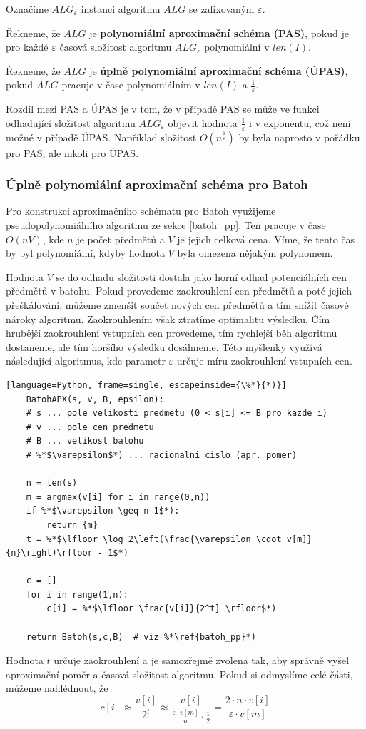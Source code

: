 \documentclass[11pt]{report} %
\numberwithin{equation}{section}
\begin{document}
Označíme $ALG_\varepsilon$ instanci algoritmu $ALG$ se zafixovaným $\varepsilon$.

Řekneme, že $ALG$ je \textbf{polynomiální aproximační schéma (PAS)}, pokud je pro každé $\varepsilon$ časová složitost algoritmu $ALG_\varepsilon$ polynomiální v $len(I)$.

Řekneme, že $ALG$ je \textbf{úplně polynomiální aproximační schéma (ÚPAS)}, pokud $ALG$ pracuje v čase polynomiálním v $len(I)$ a $\frac{1}{\varepsilon}$.

Rozdíl mezi PAS a ÚPAS je v tom, že v případě PAS se může ve funkci odhadující složitost algoritmu $ALG_\varepsilon$ objevit hodnota $\frac{1}{\varepsilon}$ i v exponentu, což není možné v případě ÚPAS. Například složitost $O(n^\frac{1}{\varepsilon})$ by byla naprosto v pořádku pro PAS, ale nikoli pro ÚPAS.

\subsubsection{Úplně polynomiální aproximační schéma pro Batoh}
Pro konstrukci aproximačního schématu pro Batoh využijeme pseudopolynomiálního algoritmu ze sekce \ref{batoh_pp}. 
Ten pracuje v čase $O(nV)$, kde $n$ je počet předmětů a $V$ je jejich celková cena. Víme, že tento čas by byl polynomiální, kdyby hodnota $V$ byla omezena nějakým polynomem. 

Hodnota $V$ se do odhadu složitosti dostala jako horní odhad potenciálních cen předmětů v batohu. Pokud provedeme zaokrouhlení cen předmětů a poté jejich přeškálování, můžeme zmenšit součet nových cen předmětů a tím snížit časové nároky algoritmu. Zaokrouhlením však ztratíme optimalitu výsledku. Čím hrubější zaokrouhlení vstupních cen provedeme, tím rychlejší běh algoritmu dostaneme, ale tím horšího výsledku dosáhneme. Této myšlenky využívá následující algoritmus, kde parametr $\varepsilon$ určuje míru zaokrouhlení vstupních cen.
\bigskip

\begin{minipage}{\linewidth}
	\label{batoh_apx}
	\begin{lstlisting}[language=Python, frame=single, escapeinside={\%*}{*)}]
	BatohAPX(s, v, B, epsilon): 
	# s ... pole velikosti predmetu (0 < s[i] <= B pro kazde i) 
	# v ... pole cen predmetu
	# B ... velikost batohu
	# %*$\varepsilon$*) ... racionalni cislo (apr. pomer)
	
	n = len(s)
	m = argmax(v[i] for i in range(0,n))
	if %*$\varepsilon \geq n-1$*):
		return {m}
	t = %*$\lfloor \log_2\left(\frac{\varepsilon \cdot v[m]}{n}\right)\rfloor - 1$*)
	
	c = []
	for i in range(1,n):
		c[i] = %*$\lfloor \frac{v[i]}{2^t} \rfloor$*)
	
	return Batoh(s,c,B)  # viz %*\ref{batoh_pp}*)
	\end{lstlisting}
\end{minipage}
\bigskip
Hodnota $t$ určuje zaokrouhlení a je samozřejmě zvolena tak, aby správně vyšel aproximační poměr a časová složitost algoritmu. Pokud si odmyslíme celé části, můžeme nahlédnout, že
$$c[i] \approx \frac{v[i]}{2^t} \approx \frac{v[i]}{\frac{\varepsilon \cdot v[m]}{n}\cdot \frac{1}{2}} = \frac{2 \cdot n \cdot v[i]}{\varepsilon \cdot v[m]}$$
\end{document}
